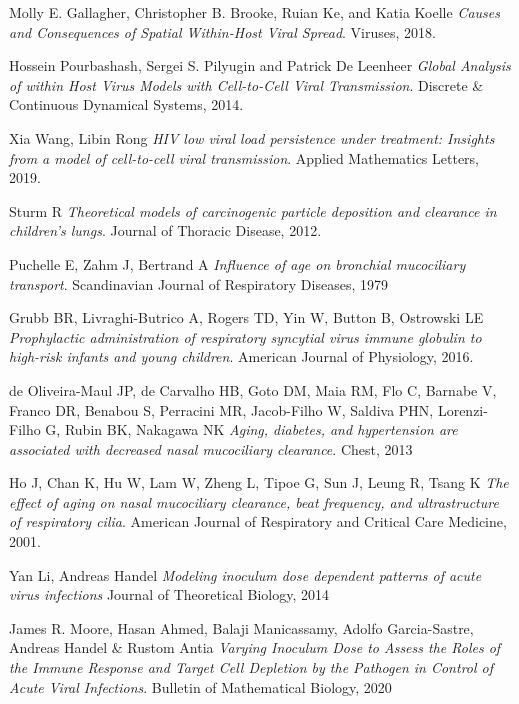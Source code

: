 \documentclass[a4paper]{article}
\begin{document}
\begin{thebibliography}{9}
Molly E. Gallagher, Christopher B. Brooke, Ruian Ke, and Katia Koelle
\textit{Causes and Consequences of Spatial Within-Host Viral Spread}.
Viruses, 2018.

Hossein Pourbashash, Sergei S. Pilyugin and Patrick De Leenheer
\textit{Global Analysis of within Host Virus Models with Cell-to-Cell Viral Transmission}.
Discrete \& Continuous Dynamical Systems, 2014.

Xia Wang, Libin Rong
\textit{HIV low viral load persistence under treatment: Insights from a model of cell-to-cell viral transmission}.
Applied Mathematics Letters, 2019.

Sturm R
\textit{Theoretical models of carcinogenic particle deposition and clearance in children’s lungs}.
Journal of Thoracic Disease, 2012.

Puchelle E, Zahm J, Bertrand A
\textit{Influence of age on bronchial mucociliary transport}.
Scandinavian Journal of Respiratory Diseases, 1979

Grubb BR, Livraghi-Butrico A, Rogers TD, Yin W, Button B, Ostrowski LE
\textit{Prophylactic administration of respiratory syncytial virus immune globulin to high-risk infants and young children}. 
American Journal of Physiology, 2016.

de Oliveira-Maul JP, de Carvalho HB, Goto DM, Maia RM, Flo C, Barnabe V, Franco DR, Benabou S, Perracini MR, Jacob-Filho W, Saldiva PHN, Lorenzi-Filho G, Rubin BK, Nakagawa NK
\textit{Aging, diabetes, and hypertension are associated with decreased nasal mucociliary clearance}.
Chest, 2013

Ho J, Chan K, Hu W, Lam W, Zheng L, Tipoe G, Sun J, Leung R, Tsang K
\textit{The effect of aging on nasal mucociliary clearance, beat frequency, and ultrastructure of respiratory cilia}. 
American Journal of Respiratory and Critical Care Medicine, 2001.

Yan Li, Andreas Handel
\textit{Modeling inoculum dose dependent patterns of acute virus infections}
Journal of Theoretical Biology, 2014

James R. Moore, Hasan Ahmed, Balaji Manicassamy, Adolfo Garcia-Sastre, Andreas Handel \& Rustom Antia
\textit{Varying Inoculum Dose to Assess the Roles of the Immune Response and Target Cell Depletion by the Pathogen in Control of Acute Viral Infections}.
Bulletin of Mathematical Biology, 2020


\end{thebibliography}
\end{document}
